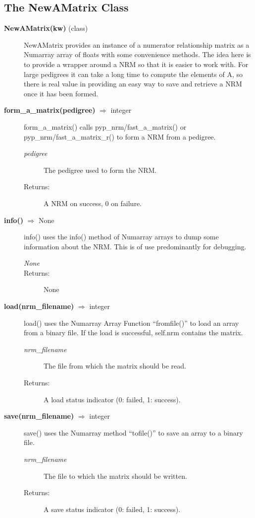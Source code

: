 \subsection*{The NewAMatrix Class}
\begin{description}
\item[\textbf{NewAMatrix(kw)} (class)]
NewAMatrix provides an instance of a numerator relationship matrix as a Numarray array of floats with some convenience methods. The idea here is to provide a wrapper around a NRM so that it is easier to work with. For large pedigrees it can take a long time to compute the elements of A, so there is real value in providing an easy way to save and retrieve a NRM once it has been formed.

\item[\textbf{form\_a\_matrix(pedigree)} $\Rightarrow$ integer]
form\_a\_matrix() calls pyp\_nrm/fast\_a\_matrix() or pyp\_nrm/fast\_a\_matrix\_r() to form a NRM from a pedigree.
\begin{description}
\item[\emph{pedigree}] The pedigree used to form the NRM.
\item[Returns:] A NRM on success, 0 on failure.
\end{description}

\item[\textbf{info()} $\Rightarrow$ None]
info() uses the info() method of Numarray arrays to dump some information about the NRM. This is of use predominantly for debugging.
\begin{description}
\item[\emph{None}]
\item[Returns:] None
\end{description}

\item[\textbf{load(nrm\_filename)} $\Rightarrow$ integer]
load() uses the Numarray Array Function ``fromfile()'' to load an array from a binary file. If the load is successful, self.nrm contains the matrix.
\begin{description}
\item[\emph{nrm\_filename}] The file from which the matrix should be read.
\item[Returns:] A load status indicator (0: failed, 1: success).
\end{description}

\item[\textbf{save(nrm\_filename)} $\Rightarrow$ integer]
save() uses the Numarray method ``tofile()'' to save an array to a binary file.
\begin{description}
\item[\emph{nrm\_filename}] The file to which the matrix should be written.
\item[Returns:] A save status indicator (0: failed, 1: success).
\end{description}

\end{description}

